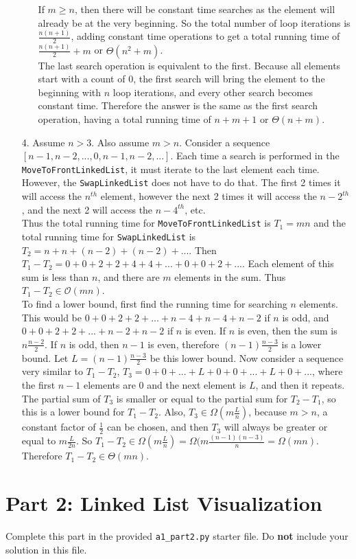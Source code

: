\documentclass[fontsize=11pt]{article}
\begin{document}
\begin{enumerate}
\begin{enumerate}
    If $m \geq n$, then there will be constant time searches as the element will already be at the very beginning. So the total number of loop iterations is $\frac{n(n + 1)}{2}$, adding constant time operations to get a total running time of $\frac{n(n + 1)}{2} + m$ or $\Theta(n^2 + m)$.\\

    The last search operation is equivalent to the first. Because all elements start with a count of 0, the first search will bring the element to the beginning with $n$ loop iterations, and every other search becomes constant time. Therefore the answer is the same as the first search operation, having a total running time of $n + m + 1$ or $\Theta(n + m)$.
\end{enumerate}

\item[4.]
Assume $n > 3$. Also assume $m > n$.
Consider a sequence $[n - 1, n - 2, ..., 0, n - 1, n - 2, ...]$. Each time a search is performed in the \texttt{MoveToFrontLinkedList}, it must iterate to the last element each time. However, the \texttt{SwapLinkedList} does not have to do that. The first 2 times it will access the $n^{th}$ element, however the next 2 times it will access the $n-2^{th}$, and the next 2 will access the $n-4^{th}$, etc.\\

Thus the total running time for \texttt{MoveToFrontLinkedList} is $T_1 = mn$ and the total running time for \texttt{SwapLinkedList} is $T_2 = n + n + (n - 2) + (n - 2) + ...$. Then $T_1 - T_2 = 0 + 0 + 2 + 2 + 4 + 4 + ... + 0 + 0 + 2 + ...$. Each element of this sum is less than $n$, and there are $m$ elements in the sum. Thus $T_1 - T_2 \in \mathcal O(mn)$.\\

To find a lower bound, first find the running time for searching $n$ elements. This would be $0 + 0 + 2 + 2 + ... + n - 4 + n - 4 + n - 2$ if $n$ is odd, and $0 + 0 + 2 + 2 + ... + n - 2 + n - 2$ if $n$ is even. If $n$ is even, then the sum is $n\frac{n - 2}{2}$. If $n$ is odd, then $n - 1$ is even, therefore $(n - 1)\frac{n - 3}{2}$ is a lower bound. Let $L = (n - 1)\frac{n - 3}{2}$ be this lower bound. Now consider a sequence very similar to $T_1 - T_2$, $T_3 = 0 + 0 + ... + L + 0 + 0 + ... + L + 0 + ...$, where the first $n - 1$ elements are 0 and the next element is $L$, and then it repeats. The partial sum of $T_3$ is smaller or equal to the partial sum for $T_2 - T_1$, so this is a lower bound for $T_1 - T_2$. Also, $T_3 \in \Omega (m\frac{L}{n})$, because $m > n$, a constant factor of $\frac{1}{2}$ can be chosen, and then $T_3$ will always be greater or equal to $m\frac{L}{2n}$. So $T_1 - T_2 \in \Omega (m\frac{L}{n}) = \Omega (m\frac{(n - 1)(n - 3)}{n} = \Omega (mn)$. Therefore $T_1 - T_2 \in \Theta (mn)$.

\end{enumerate}

\section*{Part 2: Linked List Visualization}
Complete this part in the provided \texttt{a1\_part2.py} starter file.
Do \textbf{not} include your solution in this file.
\end{document}
